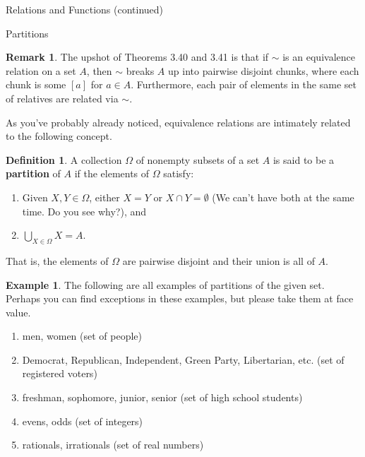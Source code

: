 \documentclass[11pt]{article}
\theoremstyle{definition}
\newtheorem{definition}[theorem]{Definition}
\newtheorem{example}[theorem]{Example}
\newtheorem{remark}[theorem]{Remark}
\begin{document}
\addtocounter{section}{3}

\begin{section}{Relations and Functions (continued)}

\addtocounter{subsection}{2}
\addtocounter{theorem}{47}

\begin{subsection}{Partitions}

\begin{remark}
The upshot of Theorems 3.40 and 3.41 is that if $\sim$ is an equivalence relation on a set $A$, then $\sim$ breaks $A$ up into pairwise disjoint chunks, where each chunk is some $[a]$ for $a\in A$. Furthermore, each  pair of elements in the same set of relatives are related via $\sim$.
\end{remark}

As you've probably already noticed, equivalence relations are intimately related to the following concept.

\begin{definition}
A collection $\Omega$ of nonempty subsets of a set $A$ is said to be a \textbf{partition} of $A$ if the elements of $\Omega$ satisfy:
\begin{enumerate}
\item Given $X,Y\in\Omega$, either $X=Y$ or $X\cap Y=\emptyset$ (We can't have both at the same time. Do you see why?), and
\item $\displaystyle \bigcup_{X\in\Omega}X=A$.
\end{enumerate}
That is, the elements of $\Omega$ are pairwise disjoint and their union is all of $A$.
\end{definition}

\begin{example}
The following are all examples of partitions of the given set.  Perhaps you can find exceptions in these examples, but please take them at face value.
\begin{enumerate}
\item men, women (set of people)
\item Democrat, Republican, Independent, Green Party, Libertarian, etc. (set of registered voters)
\item freshman, sophomore, junior, senior (set of high school students)
\item evens, odds (set of integers)
\item rationals, irrationals (set of real numbers)
\end{enumerate}
\end{example}


\end{subsection}
\end{section}
\end{document}
